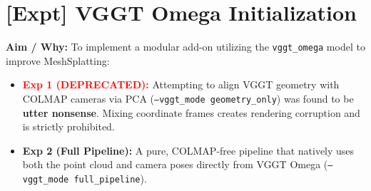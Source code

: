 \section[\textcolor{\statusSecFive}{[Expt] VGGT Omega Initialization}]{\textcolor{\statusSecFive}{[Expt] VGGT Omega Initialization}}

\begin{tcolorbox}[title={Status: [Full Pipeline Active / Exp 1 Deprecated]}, colframe=\statusSecFive, colback=\statusSecFive!5]
\textbf{Aim / Why:} To implement a modular add-on utilizing the \texttt{vggt\_omega} model to improve MeshSplatting:
\begin{itemize}
    \item \textbf{\textcolor{red}{Exp 1 (DEPRECATED):}} Attempting to align VGGT geometry with COLMAP cameras via PCA (\texttt{--vggt\_mode geometry\_only}) was found to be \textbf{utter nonsense}. Mixing coordinate frames creates rendering corruption and is strictly prohibited.
    \item \textbf{Exp 2 (Full Pipeline):} A pure, COLMAP-free pipeline that natively uses both the point cloud and camera poses directly from VGGT Omega (\texttt{--vggt\_mode full\_pipeline}).
\end{itemize}
\end{tcolorbox}

